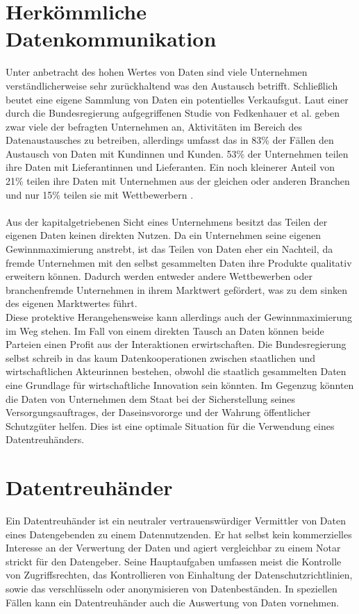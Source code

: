 \documentclass[11pt,a4paper]{scrreprt}
\begin{document}
\section{Herkömmliche Datenkommunikation}
Unter anbetracht des hohen Wertes von Daten sind viele Unternehmen verständlicherweise sehr zurückhaltend was den Austausch betrifft. Schließlich beutet eine eigene Sammlung von Daten ein potentielles Verkaufsgut. Laut einer durch die Bundesregierung aufgegriffenen Studie von Fedkenhauer et al. geben zwar viele der befragten Unternehmen an, Aktivitäten im Bereich des Datenaustausches zu betreiben, allerdings umfasst das in 83\% der Fällen den Austausch von Daten mit Kundinnen und Kunden. 53\% der Unternehmen teilen ihre Daten mit Lieferantinnen und Lieferanten. Ein noch kleinerer Anteil von 21\% teilen ihre Daten mit Unternehmen aus der gleichen oder anderen Branchen und nur 15\% teilen sie mit Wettbewerbern \cite{dt-bundesregierung2021datenstrategie}. \\\\
Aus der kapitalgetriebenen Sicht eines Unternehmens besitzt das Teilen der eigenen Daten keinen direkten Nutzen. Da ein Unternehmen seine eigenen Gewinnmaximierung anstrebt, ist das Teilen von Daten eher ein Nachteil, da fremde Unternehmen mit den selbst gesammelten Daten ihre Produkte qualitativ erweitern können. Dadurch werden entweder andere Wettbewerben oder branchenfremde Unternehmen in ihrem Marktwert gefördert, was zu dem sinken des eigenen Marktwertes führt. \\
Diese protektive Herangehensweise kann allerdings auch der Gewinnmaximierung im Weg stehen. Im Fall von einem direkten Tausch an Daten können beide Parteien einen Profit aus der Interaktionen erwirtschaften. Die Bundesregierung selbst schreib in \cite{dt-bundesregierung2021datenstrategie} das kaum Datenkooperationen zwischen staatlichen und wirtschaftlichen Akteurinnen bestehen, obwohl die staatlich gesammelten Daten eine Grundlage für wirtschaftliche Innovation sein könnten. Im Gegenzug könnten die Daten von Unternehmen dem Staat bei der Sicherstellung seines Versorgungsauftrages, der Daseinsvororge und der Wahrung öffentlicher Schutzgüter helfen. Dies ist eine optimale Situation für die Verwendung eines Datentreuhänders.
\section{Datentreuhänder}
Ein Datentreuhänder ist ein neutraler vertrauenswürdiger Vermittler von Daten eines Datengebenden zu einem Datennutzenden. Er hat selbst kein kommerzielles Interesse an der Verwertung der Daten und agiert vergleichbar zu einem Notar strickt für den Datengeber. Seine Hauptaufgaben umfassen meist die Kontrolle von Zugriffsrechten, das Kontrollieren von Einhaltung der Datenschutzrichtlinien, sowie das verschlüsseln oder anonymisieren von Datenbeständen. In speziellen Fällen kann ein Datentreuhänder auch die Auswertung von Daten vornehmen. \cite{dt-bundesregierung2021datenstrategie}\cite{dt-richter2020ddvtalk}
\end{document}
